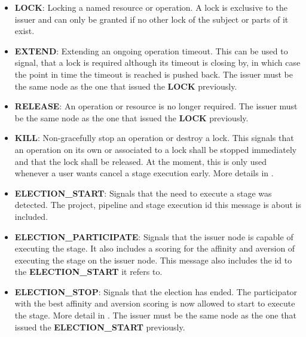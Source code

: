 \begin{itemize}
	\item \textbf{LOCK}: Locking a named resource or operation.
	A lock is exclusive to the issuer and can only be granted if no other lock of the subject or parts of it exist.
	\item \textbf{EXTEND}: Extending an ongoing operation timeout.
	This can be used to signal, that a lock is required although its timeout is closing by, in which case the point in time the timeout is reached is pushed back.
	The issuer must be the same node as the one that issued the \textbf{LOCK} previously.
	\item \textbf{RELEASE}: An operation or resource is no longer required.
	The issuer must be the same node as the one that issued the \textbf{LOCK} previously.
	\item \textbf{KILL}: Non-gracefully stop an operation or destroy a lock.
	This signals that an operation on its own or associated to a lock shall be stopped immediately and that the lock shall be released.
	At the moment, this is only used whenever a user wants cancel a stage execution early. More details in .
	\item \textbf{ELECTION\_START}: Signals that the need to execute a stage was detected.
	The project, pipeline and stage execution id this message is about is included.
	\item \textbf{ELECTION\_PARTICIPATE}: Signals that the issuer node is capable of executing the stage.
	It also includes a scoring for the affinity and aversion of executing the stage on the issuer node.
	This message also includes the id to the \textbf{ELECTION\_START} it refers to.
	\item \textbf{ELECTION\_STOP}: Signals that the election has ended.
	The participator with the best affinity and aversion scoring is now allowed to start to execute the stage.
	More detail in .
	The issuer must be the same node as the one that issued the \textbf{ELECTION\_START} previously.
\end{itemize}

